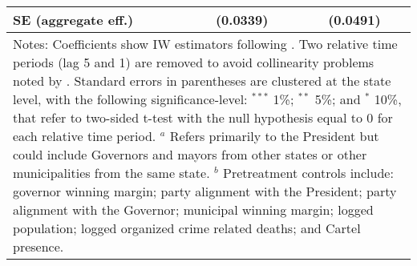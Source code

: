 \begin{table}[htbp]
{\begin{tabular}{lcc}
SE (aggregate eff.)        &              (0.0339)       &           (0.0491)   \\
\hline \hline
\multicolumn{3}{p{0.7\textwidth}}{\footnotesize{Notes: Coefficients show IW estimators following \citet{abraham_sun_2020}. Two relative time periods (lag 5 and 1) are removed to avoid collinearity problems noted by \citet{abraham_sun_2020}. Standard errors in parentheses are clustered at the state level, with the following significance-level: $^{***}$ 1\%; $^{**}$ 5\%; and $^*$ 10\%, that refer to two-sided t-test with the null hypothesis equal to 0 for each relative time period. $^a$ Refers primarily to the President but could include Governors and mayors from other states or other municipalities from the same state. $^b$ Pretreatment controls include: governor winning margin; party alignment with the President;  party alignment with the Governor; municipal winning margin; logged population; logged organized crime related deaths; and Cartel presence.}} \\
\end{tabular}
}
\end{table}
